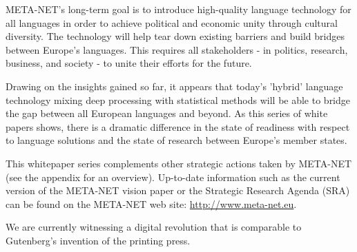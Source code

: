 \documentclass{../../metanetpaper}
\begin{document}
\begin{Parallel}[c]{79mm}{78mm}
{

META-NET’s long-term goal is to introduce high-quality language
technology for all languages in order to achieve political and
economic unity through cultural diversity. The technology will help
tear down existing barriers and build bridges between Europe’s
languages. This requires all stakeholders - in politics, research,
business, and society - to unite their efforts for the future.

Drawing on the insights gained so far, it appears that today’s
'hybrid' language technology mixing deep processing with statistical
methods will be able to bridge the gap between all European languages
and beyond. As this series of white papers shows, there is a dramatic
difference in the state of readiness with respect to language
solutions and the state of research between Europe’s member states.

This whitepaper series complements other strategic actions taken by
META-NET (see the appendix for an overview). Up-to-date information
such as the current version of the META-NET vision paper \cite{Vision}
or the Strategic Research Agenda (SRA) can be found on the META-NET
web site: \url{http://www.meta-net.eu}.

We are currently witnessing a digital revolution that is comparable to
Gutenberg’s invention of the printing press.
}

\ParallelPar


\end{Parallel}
\end{document}

